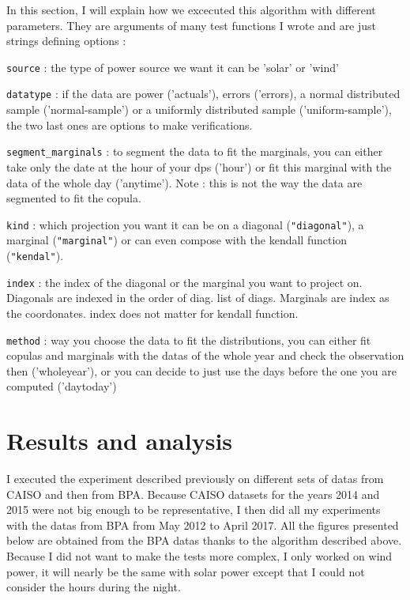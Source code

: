 \documentclass{article}
\begin{document}
\begin{itemize}
	In this section, I will explain how we excecuted this algorithm with different parameters. They are arguments of many test functions I wrote and are just strings defining options :\newline
	
	\texttt{source} : the type of power source we want it can be 'solar' or 'wind'\newline
	
	\texttt{datatype} : if the data are power ('actuals'), errors ('errors), a normal distributed sample ('normal-sample') or a uniformly distributed sample ('uniform-sample'), the two last ones are options to make verifications. \newline
	
	\texttt{segment\_marginals} : to segment the data to fit the marginals, you can either take only the date at the hour of your dps ('hour') or fit this marginal with the data of the whole day ('anytime'). Note : this is not the way the data are segmented to fit the copula.
	
	\texttt{kind} : which projection you want it can be on a diagonal (\texttt{"diagonal"}), a marginal (\texttt{"marginal"}) or can even compose with the kendall function (\texttt{"kendal"}). \newline
	
	\texttt{index} : the index of the diagonal or the marginal you want to project on. Diagonals are indexed in the order of diag. list of diags. Marginals are index as the coordonates. index does not matter for kendall function.\newline
	
	\texttt{method} : way you choose the data to fit the distributions, you can either fit copulas and marginals with the datas of the whole year and check the observation then ('wholeyear'), or you can decide to just use the days before the one you are computed ('daytoday')
	
\end{itemize}

\newpage

\section{Results and analysis}
I executed the experiment described previously on different sets of datas from CAISO and then from BPA. Because CAISO datasets for the years 2014 and 2015 were not big enough to be representative, I then did all my experiments with the datas from BPA from May 2012 to April 2017. All the figures presented below are obtained from the BPA datas thanks to the algorithm described above. Because I did not want to make the tests more complex, I only worked on wind power, it will nearly be the same with solar power except that I could not consider the hours during the night.
\end{document}
